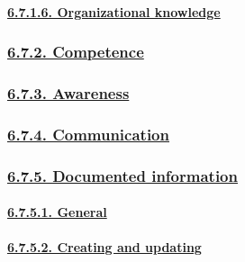 \documentclass[
]{article}
\begin{document}
\hypertarget{organizational-knowledge}{%
\paragraph{\texorpdfstring{\protect\hyperlink{organizational-knowledge-1}{6.7.1.6.
Organizational
knowledge}}{6.7.1.6. Organizational knowledge}}\label{organizational-knowledge}}

\hypertarget{competence}{%
\subsubsection{\texorpdfstring{\protect\hyperlink{competence-1}{6.7.2.
Competence}}{6.7.2. Competence}}\label{competence}}

\hypertarget{awareness}{%
\subsubsection{\texorpdfstring{\protect\hyperlink{awareness-1}{6.7.3.
Awareness}}{6.7.3. Awareness}}\label{awareness}}

\hypertarget{communication}{%
\subsubsection{\texorpdfstring{\protect\hyperlink{communication-1}{6.7.4.
Communication}}{6.7.4. Communication}}\label{communication}}

\hypertarget{documented-information}{%
\subsubsection{\texorpdfstring{\protect\hyperlink{documented-information-1}{6.7.5.
Documented
information}}{6.7.5. Documented information}}\label{documented-information}}

\hypertarget{general-3}{%
\paragraph{\texorpdfstring{\protect\hyperlink{general-12}{6.7.5.1.
General}}{6.7.5.1. General}}\label{general-3}}

\hypertarget{creating-and-updating}{%
\paragraph{\texorpdfstring{\protect\hyperlink{creating-and-updating-1}{6.7.5.2.
Creating and
updating}}{6.7.5.2. Creating and updating}}\label{creating-and-updating}}
\end{document}
